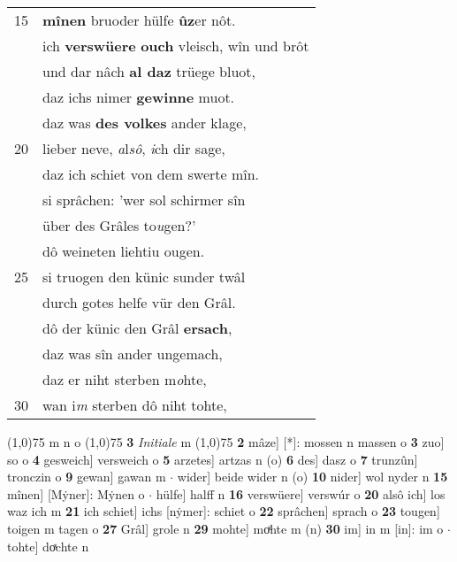 \documentclass[8pt,a4paper,notitlepage]{article}
\begin{document}
\begin{table}[ht]
\begin{minipage}[t]{0.5\linewidth}
\begin{tabular}{rl}
15 & \textbf{mînen} bruoder hülfe \textbf{ûz}er nôt.\\ 
 & ich \textbf{verswüere} \textbf{ouch} vleisch, wîn und brôt\\ 
 & und dar nâch \textbf{al daz} trüege bluot,\\ 
 & daz ichs nimer \textbf{gewinne} muot.\\ 
 & daz was \textbf{des volkes} ander klage,\\ 
20 & lieber neve, \textit{a}l\textit{sô}, \textit{i}ch dir sage,\\ 
 & daz ich schiet von dem swerte mîn.\\ 
 & si sprâchen: 'wer sol schirmer sîn\\ 
 & über des Grâles to\textit{u}gen?'\\ 
 & dô weineten liehtiu ougen.\\ 
25 & si truogen den künic sunder twâl\\ 
 & durch gotes helfe vür den Grâl.\\ 
 & dô der künic den Grâl \textbf{ersach},\\ 
 & daz was sîn ander ungemach,\\ 
 & daz er niht sterben m\textit{o}hte,\\ 
30 & wan i\textit{m} sterben dô niht tohte,\\ 
\end{tabular}
\scriptsize
\line(1,0){75} \newline
m n o \newline
\line(1,0){75} \newline
\textbf{3} \textit{Initiale} m  \newline
\line(1,0){75} \newline
\textbf{2} mâze] [*]: mossen n massen o \textbf{3} zuo] so o \textbf{4} gesweich] versweich o \textbf{5} arzetes] artzas n (o) \textbf{6} des] dasz o \textbf{7} trunzûn] tronczin o \textbf{9} gewan] gawan m  $\cdot$ wider] beide wider n (o) \textbf{10} nider] wol nyder n \textbf{15} mînen] [Mẏner]: Mẏnen o  $\cdot$ hülfe] halff n \textbf{16} verswüere] verswúr o \textbf{20} alsô ich] los waz ich m \textbf{21} ich schiet] ichs [nẏmer]: schiet o \textbf{22} sprâchen] sprach o \textbf{23} tougen] toigen m tagen o \textbf{27} Grâl] grole n \textbf{29} mohte] moͯhte m (n) \textbf{30} im] in m [in]: im o  $\cdot$ tohte] doͯchte n \newline
\end{minipage}
\end{table}
\newpage
\end{document}
